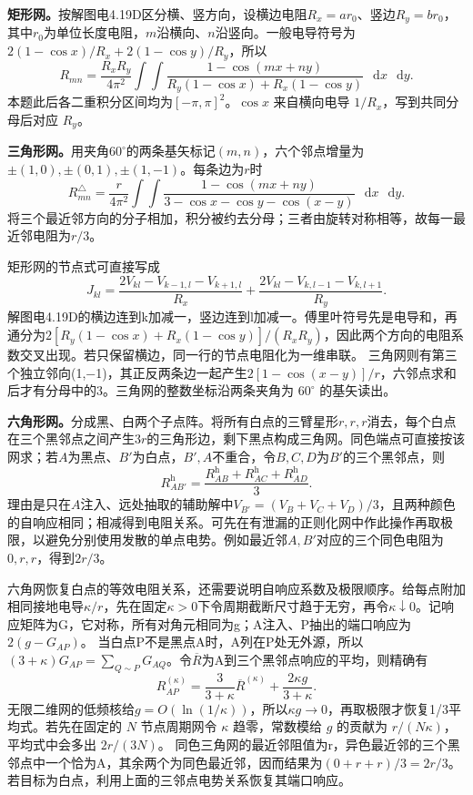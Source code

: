 \documentclass[UTF8,fontset=fandol,a4paper,11pt]{ctexart}
\newcommand{\dd}{\mathop{}\!\mathrm{d}}
\begin{document}
\textbf{矩形网。}按解图电4.19D区分横、竖方向，设横边电阻$R_x=ar_0$、竖边$R_y=br_0$，其中$r_0$为单位长度电阻，$m$沿横向、$n$沿竖向。一般电导符号为$2(1-\cos x)/R_x+2(1-\cos y)/R_y$，所以
\[
R_{mn}=\frac{R_xR_y}{4\pi^2}\int\!\!\int
\frac{1-\cos(mx+ny)}{R_y(1-\cos x)+R_x(1-\cos y)}\,\dd x\,\dd y.
\]
本题此后各二重积分区间均为$[-\pi,\pi]^2$。$\cos x$ 来自横向电导 $1/R_x$，写到共同分母后对应 $R_y$。

\textbf{三角形网。}用夹角$60^\circ$的两条基矢标记$(m,n)$，六个邻点增量为$\pm(1,0),\pm(0,1),\pm(1,-1)$。每条边为$r$时
\[
R^\triangle_{mn}=\frac r{4\pi^2}\int\!\!\int
\frac{1-\cos(mx+ny)}
{3-\cos x-\cos y-\cos(x-y)}\,\dd x\,\dd y.
\]
将三个最近邻方向的分子相加，积分被约去分母；三者由旋转对称相等，故每一最近邻电阻为$r/3$。


矩形网的节点式可直接写成
\[
J_{kl}=\frac{2V_{kl}-V_{k-1,l}-V_{k+1,l}}{R_x}
+\frac{2V_{kl}-V_{k,l-1}-V_{k,l+1}}{R_y}.
\]
解图电4.19D的横边连到k加减一，竖边连到l加减一。傅里叶符号先是电导和，再通分为$2[R_y(1-\cos x)+R_x(1-\cos y)]/(R_xR_y)$，因此两个方向的电阻系数交叉出现。若只保留横边，同一行的节点电阻化为一维串联。
三角网则有第三个独立邻向(1,−1)，其正反两条边一起产生$2[1-\cos(x-y)]/r$，六邻点求和后才有分母中的3。三角网的整数坐标沿两条夹角为 $60^\circ$ 的基矢读出。

\textbf{六角形网。}分成黑、白两个子点阵。将所有白点的三臂星形$r,r,r$消去，每个白点在三个黑邻点之间产生$3r$的三角形边，剩下黑点构成三角网。同色端点可直接按该网求；若$A$为黑点、$B'$为白点，$B',A$不重合，令$B,C,D$为$B'$的三个黑邻点，则
\[
R^{\mathrm h}_{AB'}=\frac{R^{\mathrm h}_{AB}+R^{\mathrm h}_{AC}
+R^{\mathrm h}_{AD}}3.
\]
理由是只在$A$注入、远处抽取的辅助解中$V_{B'}=(V_B+V_C+V_D)/3$，且两种颜色的自响应相同；相减得到电阻关系。可先在有泄漏的正则化网中作此操作再取极限，以避免分别使用发散的单点电势。例如最近邻$A,B'$对应的三个同色电阻为$0,r,r$，得到$2r/3$。


六角网恢复白点的等效电阻关系，还需要说明自响应系数及极限顺序。给每点附加相同接地电导$\kappa/r$，先在固定$\kappa>0$下令周期截断尺寸趋于无穷，再令$\kappa\downarrow0$。记响应矩阵为G，它对称，所有对角元相同为g；A注入、P抽出的端口响应为$2(g-G_{AP})$。
当白点P不是黑点A时，A列在P处无外源，所以$(3+\kappa)G_{AP}=\sum_{Q\sim P}G_{AQ}$。令$\overline R$为A到三个黑邻点响应的平均，则精确有
\[
R_{AP}^{(\kappa)}=\frac3{3+\kappa}\overline R^{(\kappa)}+\frac{2\kappa g}{3+\kappa}.
\]
无限二维网的低频核给$g=O(\ln(1/\kappa))$，所以$\kappa g\to0$，再取极限才恢复1/3平均式。若先在固定的 $N$ 节点周期网令 $\kappa$ 趋零，常数模给 $g$ 的贡献为 $r/(N\kappa)$，平均式中会多出 $2r/(3N)$。
同色三角网的最近邻阻值为r，异色最近邻的三个黑邻点中一个恰为A，其余两个为同色最近邻，因而结果为$(0+r+r)/3=2r/3$。若目标为白点，利用上面的三邻点电势关系恢复其端口响应。
\end{document}
